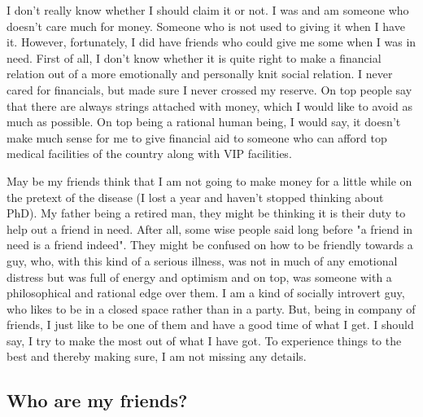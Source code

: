I don't really know whether I should claim it or not. I was and am someone who doesn't care much 
for money. Someone who is not used to giving it when I have it. However, fortunately, I did have friends who could give me 
some when I was in need. First of all, I don't know whether it is quite right to make a financial 
relation out of a more emotionally and personally knit social relation. I never cared for financials, 
but made sure I never crossed my reserve. On top people say that there are always strings attached with 
money, which I would like to avoid as much as possible. On top being a rational human being, I would 
say, it doesn't make much sense for me to give financial aid to someone who can afford top medical facilities of the country along with VIP facilities. 

May be my friends think that I am not going to make money for a little while on the pretext of 
the disease (I lost a year and haven't stopped thinking about PhD). My father being a retired man, 
they might be thinking it is their duty to help out a friend in need. After all, some wise people said 
long before "a friend in need is a friend indeed". They might be confused on how to be friendly 
towards a guy, who, with this kind of a serious illness, was not in much of any emotional distress but was full of energy 
and optimism and on top, was someone with a philosophical and rational edge over them. I am a kind of socially
introvert guy, who likes to be in a closed space rather than in a party. But, being in company of friends, 
I just like to be one of them and have a good time of what I get. I should say, I try to make the
most out of what I have got. To experience things to the best and thereby making sure, I am not missing any details. 

\subsection*{Who are my friends?}

